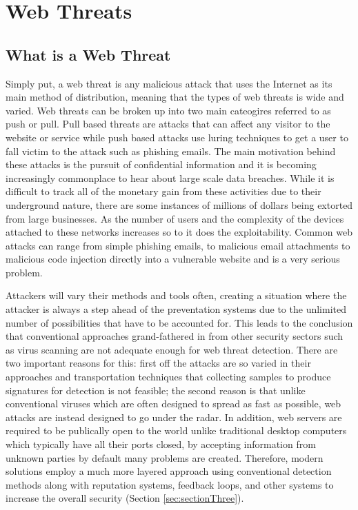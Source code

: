 \chapter{Web Threats} \label{sec:sectionTwo}
\section{What is a Web Threat}

Simply put, a web threat is any malicious attack that uses the Internet as its main method of distribution, meaning that the types of web threats is wide and varied.  Web threats can be broken up into two main cateogires referred to as push or pull.  Pull based threats are attacks that can affect any visitor to the website or service while push based attacks use luring techniques to get a user to fall victim to the attack such as phishing emails.  The main motivation behind these attacks is the pursuit of confidential information and it is becoming increasingly commonplace to hear about large scale data breaches.  While it is difficult to track all of the monetary gain from these activities due to their underground nature, there are some instances of millions of dollars being extorted from large businesses.  As the number of users and the complexity of the devices attached to these networks increases so to it does the exploitability.  Common web attacks can range from simple phishing emails, to malicious email attachments to malicious code injection directly into a vulnerable website and is a very serious problem.

Attackers will vary their methods and tools often, creating a situation where the attacker is always a step ahead of the preventation systems due to the unlimited number of possibilities that have to be accounted for.  This leads to the conclusion that conventional approaches grand-fathered in from other security sectors such as virus scanning are not adequate enough for web threat detection.  There are two important reasons for this: first off the attacks are so varied in their approaches and transportation techniques that collecting samples to produce signatures for detection is not feasible; the second reason is that unlike conventional viruses which are often designed to spread as fast as possible, web attacks are instead designed to go under the radar.  In addition, web servers are required to be publically open to the world unlike traditional desktop computers which typically have all their ports closed, by accepting information from unknown parties by default many problems are created.  Therefore, modern solutions employ a much more layered approach using conventional detection methods along with reputation systems, feedback loops, and other systems to increase the overall security (Section \ref{sec:sectionThree}). \cite{trendMicro}

